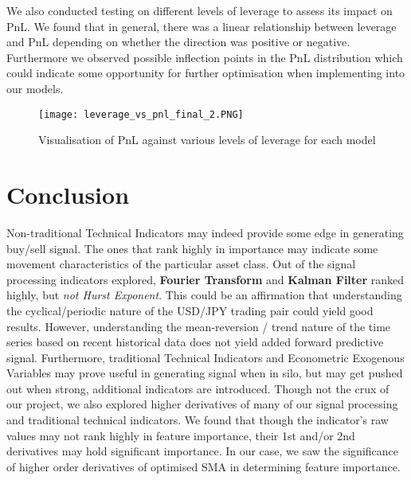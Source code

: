 \documentclass{article}
\begin{document}
\noindent We also conducted testing on different levels of leverage to assess its impact on PnL. We found that in general, there was a linear relationship between leverage and PnL depending on whether the direction was positive or negative. Furthermore we observed possible inflection points in the PnL distribution which could indicate some opportunity for further optimisation when implementing into our models.
\begin{figure}[h]
    \centering
    \texttt{[image: leverage\_vs\_pnl\_final\_2.PNG]}
    \caption{Visualisation of PnL against various levels of leverage for each model}
\end{figure}

\newpage
\section{Conclusion}
Non-traditional Technical Indicators may indeed provide some edge in generating buy/sell signal. The ones that rank highly in importance may indicate some movement characteristics of the particular asset class.
\newline
\newline
Out of the signal processing indicators explored, \textbf{Fourier Transform} and \textbf{Kalman Filter} ranked highly, but \textit{not Hurst Exponent}. This could be an affirmation that understanding the cyclical/periodic nature of the USD/JPY trading pair could yield good results. However, understanding the mean-reversion / trend nature of the time series based on recent historical data does not yield added forward predictive signal.
\newline
\newline
Furthermore, traditional Technical Indicators and Econometric Exogenous Variables may prove useful in generating signal when in silo, but may get pushed out when strong, additional indicators are introduced.
\newline
\newline
Though not the crux of our project, we also explored higher derivatives of many of our signal processing and traditional technical indicators. We found that though the indicator's raw values may not rank highly in feature importance, their 1st and/or 2nd derivatives may hold significant importance. In our case, we saw the significance of higher order derivatives of optimised SMA in determining feature importance.
\newline
\newline
\end{document}

